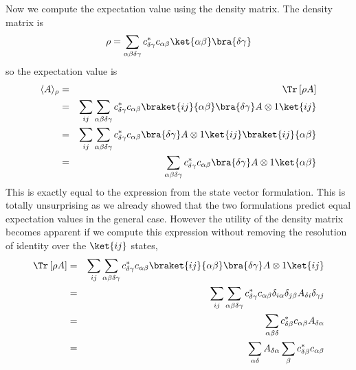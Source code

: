 \documentclass{article}
\begin{document}
Now we compute the expectation value using the density matrix. The density matrix is \begin{equation}
\rho = \sum_{\alpha \beta \delta \gamma} c^*_{\delta \gamma}c_{\alpha \beta} \ket{\alpha \beta}\bra{\delta \gamma} \end{equation}
so the expectation value is \begin{eqnarray}
\langle A \rangle_{\rho} &=& \Tr \left[\rho A \right] \nonumber \\
&=& \sum_{ij}\sum_{\alpha \beta \delta \gamma} c^*_{\delta \gamma}c_{\alpha \beta} \braket{ij}{\alpha \beta} \bra{\delta \gamma} A\otimes 1 \ket{ij} \nonumber \\
&=& \sum_{ij}\sum_{\alpha \beta \delta \gamma} c^*_{\delta \gamma}c_{\alpha \beta} \bra{\delta \gamma} A\otimes 1 \ket{ij} \braket{ij}{\alpha \beta} \nonumber \\
&=&\sum_{\alpha \beta \delta \gamma} c^*_{\delta \gamma}c_{\alpha \beta} \bra{\delta \gamma} A\otimes 1 \ket{\alpha \beta} \end{eqnarray}
This is exactly equal to the expression from the state vector formulation. This is totally unsurprising as we already showed that the two formulations predict equal expectation values in the general case. However the utility of the density matrix becomes apparent if we compute this expression without removing the resolution of identity over the $\ket{ij}$ states, \begin{eqnarray}
\Tr \left[\rho A \right] &=& \sum_{ij}\sum_{\alpha \beta \delta \gamma} c^*_{\delta \gamma}c_{\alpha \beta} \braket{ij}{\alpha \beta} \bra{\delta \gamma} A\otimes 1 \ket{ij} \nonumber \\
&=& \sum_{ij}\sum_{\alpha \beta \delta \gamma} c^*_{\delta \gamma}c_{\alpha \beta} \delta_{i\alpha}\delta_{j\beta}A_{\delta i}\delta_{\gamma j} \nonumber \\
&=& \sum_{\alpha \beta \delta} c^*_{\delta \beta}c_{\alpha \beta} A_{\delta \alpha} \nonumber \\
&=& \sum_{\alpha \delta} A_{\delta \alpha} \sum_{\beta} c^*_{\delta \beta}c_{\alpha \beta} \end{eqnarray}
\end{document}
